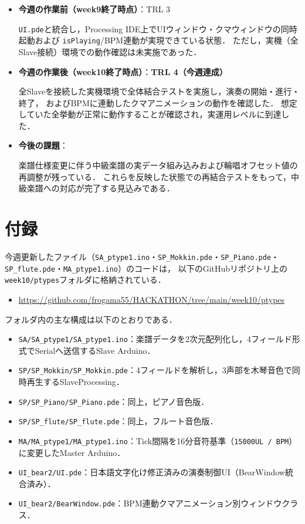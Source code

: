 \documentclass[uplatex,dvipdfmx]{jlreq}
\begin{document}
\begin{itemize}
  \item \textbf{今週の作業前（week9終了時点）}：TRL 3

  \texttt{UI.pde}と統合し，Processing IDE上でUIウィンドウ・クマウィンドウの同時起動および
  \texttt{isPlaying}/BPM連動が実現できている状態．
  ただし，実機（全Slave接続）環境での動作確認は未実施であった．

  \item \textbf{今週の作業後（week10終了時点）}：\textbf{TRL 4（今週達成）}

  全Slaveを接続した実機環境で全体結合テストを実施し，演奏の開始・進行・終了，
  およびBPMに連動したクマアニメーションの動作を確認した．
  想定していた全挙動が正常に動作することが確認され，実運用レベルに到達した．

  \item \textbf{今後の課題}：

  楽譜仕様変更に伴う中級楽譜の実データ組み込みおよび輪唱オフセット値の再調整が残っている．
  これらを反映した状態での再結合テストをもって，中級楽譜への対応が完了する見込みである．
\end{itemize}


\newpage
\section{付録}
今週更新したファイル（\texttt{SA\_ptype1.ino}・\texttt{SP\_Mokkin.pde}・\texttt{SP\_Piano.pde}・
\texttt{SP\_flute.pde}・\texttt{MA\_ptype1.ino}）のコードは，
以下のGitHubリポジトリ上の\texttt{week10/ptypes}フォルダに格納されている．

\begin{itemize}
  \item \url{https://github.com/frogama55/HACKATHON/tree/main/week10/ptypes}
\end{itemize}

フォルダ内の主な構成は以下のとおりである．
\begin{itemize}
  \item \texttt{SA/SA\_ptype1/SA\_ptype1.ino}：楽譜データを2次元配列化し，4フィールド形式でSerialへ送信するSlave Arduino．
  \item \texttt{SP/SP\_Mokkin/SP\_Mokkin.pde}：4フィールドを解析し，3声部を木琴音色で同時再生するSlaveProcessing．
  \item \texttt{SP/SP\_Piano/SP\_Piano.pde}：同上，ピアノ音色版．
  \item \texttt{SP/SP\_flute/SP\_flute.pde}：同上，フルート音色版．
  \item \texttt{MA/MA\_ptype1/MA\_ptype1.ino}：Tick間隔を16分音符基準（\texttt{15000UL / BPM}）に変更したMaster Arduino．
  \item \texttt{UI\_bear2/UI.pde}：日本語文字化け修正済みの演奏制御UI（BearWindow統合済み）．
  \item \texttt{UI\_bear2/BearWindow.pde}：BPM連動クマアニメーション別ウィンドウクラス．
\end{itemize}
\end{document}
